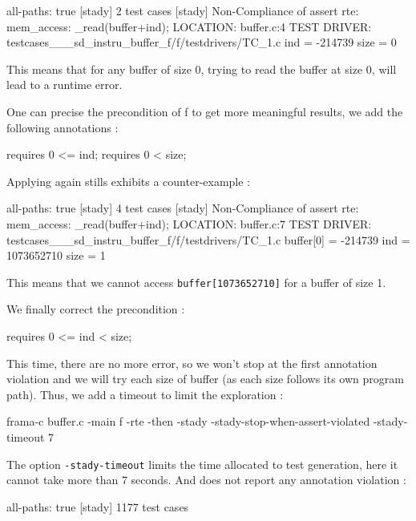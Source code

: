 \documentclass[web]{frama-c-book}
\begin{document}
\begin{shell}
[stady] all-paths: true
[stady] 2 test cases
[stady] Non-Compliance of assert rte: mem_access: \valid_read(buffer+ind); 
        LOCATION: buffer.c:4
        TEST DRIVER: testcases___sd_instru_buffer_f/f/testdrivers/TC_1.c
        ind = -214739
        size = 0
\end{shell}

This means that for any buffer of size 0, trying to read the buffer at size 0, will lead to a runtime error.

One can precise the precondition of f to get more meaningful results, we add the following annotations :

\begin{ccode}
  requires 0 <= ind;
  requires 0 < size;
\end{ccode}

Applying \stady again stills exhibits a counter-example :

\begin{shell}
[stady] all-paths: true
[stady] 4 test cases
[stady] Non-Compliance of assert rte: mem_access: \valid_read(buffer+ind); 
        LOCATION: buffer.c:7
        TEST DRIVER: testcases___sd_instru_buffer_f/f/testdrivers/TC_1.c
        buffer[0] = -214739
        ind = 1073652710
        size = 1
\end{shell}

This means that we cannot access \lstinline'buffer[1073652710]' for a buffer of size 1.

We finally correct the precondition :

\begin{ccode}
  requires 0 <= ind < size;
\end{ccode}

This time, there are no more error, so we won't stop at the first annotation violation and we will try each size of buffer (as each size follows its own program path). Thus, we add a timeout to limit the exploration :

\begin{shell}
  frama-c buffer.c -main f -rte -then -stady -stady-stop-when-assert-violated
  -stady-timeout 7
\end{shell}

The option \lstinline[language=shell]'-stady-timeout' limits the time allocated to test generation, here it cannot take more than 7 seconds.
And \stady does not report any annotation violation :

\begin{shell}
[stady] all-paths: true
[stady] 1177 test cases
\end{shell}
\end{document}
